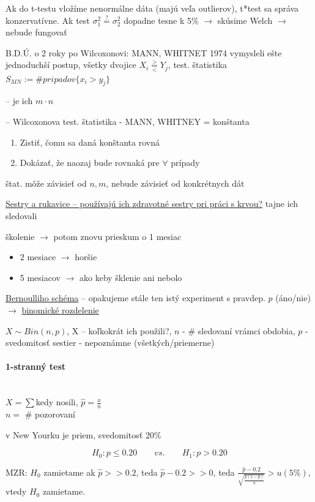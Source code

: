\documentclass[unknownkeysallowed]{article}
\begin{document}
Ak do t-testu vložíme nenormálne dáta (majú veľa outlierov), t*test sa správa konzervatívne. Ak test $\sigma_1^2 \overset{?}{=} \sigma_2^2$ dopadne tesne k 5\% $\to$ skúsime Welch $\to$ nebude fungovať

B.D.Ú. o 2 roky po Wilcoxonovi: MANN, WHITNET 1974 vymysleli ešte jednoduchší postup, všetky dvojice $X_i \overset{>}{\underset{<}{=}} Y_j$, test. štatistika $S_{MN} := \# pripadov\{ x_i > y_j \}$

\qquad -- je ich $m\cdot n$

\qquad -- Wilcoxonova test. štatistika - MANN, WHITNEY = konštanta
\begin{enumerate}
\item Zistiť, čomu sa daná konštanta rovná
\item Dokázať, že naozaj bude rovnaká pre $\forall$ prípady
\end{enumerate}
štat. môže závisieť od $n,m$, nebude závisieť od konkrétnych dát

\underline{Sestry a rukavice -- používajú ich zdravotné sestry pri práci s krvou?} tajne ich sledovali

školenie $\to$ potom znovu prieskum o 1 mesiac
\begin{itemize}
\item 2 mesiace $\to$ horšie
\item 5 mesiacov $\to$ ako keby šklenie ani nebolo
\end{itemize}

\underline{Bernoulliho schéma} -- opakujeme stále ten istý experiment s pravdep. $p$ (áno/nie) $\to$ \underline{binomické rozdelenie}

$X \sim Bin(n,p)$, X -- koľkokrát ich použili?, $n$ - \# sledovaní vrámci obdobia, $p$ - svedomitosť sestier - nepoznámne (všetkých/priemerne)

\paragraph{1-stranný test}~\\
$X = \sum$kedy nosili, $\hat{p} = \frac{x}{n}$\\
$n = $ \# pozorovaní

v New Yourku je priem, svedomitosť 20\%

$$H_0: p \leq 0.20 \qquad vs. \qquad H_1: p > 0.20$$

MZR: $H_0$ zamietame ak $\hat{p} >> 0.2$, teda $\hat{p}-0.2 >> 0$, teda $\frac{\hat{p}-0.2}{\sqrt{\frac{\hat{p}(1-\hat{p})}{n}}} > u(5\%)$, vtedy $H_0$ zamietame.
\end{document}
